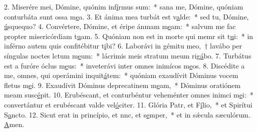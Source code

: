2. Miserére mei, Dómine, quónim inf\uline{í}rmus sum:~* sana me, Dómine, quóniam conturbáta sunt ossa m\uline{e}a.
3. Et ánima mea turbát est v\uline{a}lde:~* sed tu, Dómine, \uline{ú}squequo?
4. Convértere, Dómine, et éripe ánmam m\uline{e}am:~* salvum me fac propter misericórdiam t\uline{u}am.
5. Quóniam non est in morte qui memr sit t\uline{u}i:~* in inférno autem quis confitébitur t\uline{i}bi?
6. Laborávi in gémitu meo,~† lavábo per síngulas noctes lctum m\uline{e}um:~* lácrimis meis stratum meum rig\uline{á}bo.
7. Turbátus est a furóre óclus m\uline{e}us:~* inveterávi inter omnes inimícos m\uline{e}os.
8. Discédite a me, omnes, qui operámini inquit\uline{á}tem:~* quóniam exaudívit Dóminus vocem fletus m\uline{e}i.
9. Exaudívit Dóminus deprecatinem m\uline{e}am,~* Dóminus oratiónem meam susc\uline{é}pit.
10. Erubéscant, et conturbéntur veheménter omnes inimci m\uline{e}i:~* convertántur et erubéscant valde vel\uline{ó}citer.
11. Glória Patr, et F\uline{í}lio,~* et Spirítui S\uline{a}ncto.
12. Sicut erat in princípio, et nnc, et s\uline{e}mper,~* et in sǽcula sæculórum. \uline{A}men.
